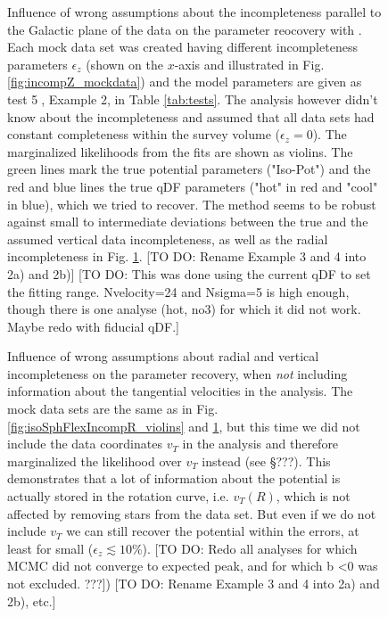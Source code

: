 \begin{figure}
\caption{Influence of wrong assumptions about the incompleteness parallel to the Galactic plane of the data on the parameter reocovery with \RM. Each mock data set was created having different incompleteness parameters $\epsilon_z$ (shown on the $x$-axis and illustrated in Fig. \ref{fig:incompZ_mockdata}) and the model parameters are given as test \textcircled{5}, Example 2, in Table \ref{tab:tests}. The analysis however didn't know about the incompleteness and assumed that all data sets had constant completeness within the survey volume ($\epsilon_z = 0$). The marginalized likelihoods from the fits are shown as violins. The green lines mark the true potential parameters ("Iso-Pot") and the red and blue lines the true qDF parameters ("hot" \MAP in red and "cool" \MAP in blue), which we tried to recover. The \RM method seems to be robust against small to intermediate deviations between the true and the assumed vertical data incompleteness, as well as the radial incompleteness in Fig. \ref{fig:isoSphFlexIncompZ_violins}. [TO DO: Rename Example 3 and 4 into 2a) and 2b)] [TO DO: This was done using the current qDF to set the fitting range. Nvelocity=24 and Nsigma=5 is high enough, though there is one analyse (hot, no3) for which it did not work. Maybe redo with fiducial qDF.]} 
\label{fig:isoSphFlexIncompZ_violins}
\end{figure}

\begin{figure}
\caption{Influence of wrong assumptions about radial and vertical incompleteness on the parameter recovery, when \emph{not} including information about the tangential velocities in the analysis. The mock data sets are the same as in Fig. \ref{fig:isoSphFlexIncompR_violins} and \ref{fig:isoSphFlexIncompZ_violins}, but this time we did not include the data coordinates $v_T$ in the analysis and therefore marginalized the likelihood over $v_T$ instead (see \S ???). This demonstrates that a lot of information about the potential is actually stored in the rotation curve, i.e. $v_T(R)$, which is not affected by removing stars from the data set. But even if we do not include $v_T$ we can still recover the potential within the errors, at least for small ($\epsilon_z \lesssim 10\%$). [TO DO: Redo all analyses for which MCMC did not converge to expected peak, and for which b <0 was not excluded. ???]) [TO DO: Rename Example 3 and 4 into 2a) and 2b), etc.]} 
\label{fig:isoSphFlexIncomp_marginal_violins}
\end{figure}
